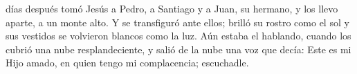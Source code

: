  días después tomó Jesús a Pedro, a Santiago y a Juan, su hermano, y los llevo aparte, a un monte alto. Y se transfiguró ante ellos;
brilló su rostro como el sol y sus vestidos se volvieron blancos como la luz. Aún estaba el hablando, cuando los cubrió una nube resplandeciente,
y salió de la nube una voz que decía: Este es mi Hijo amado, en quien tengo mi complacencia; escuchadle.